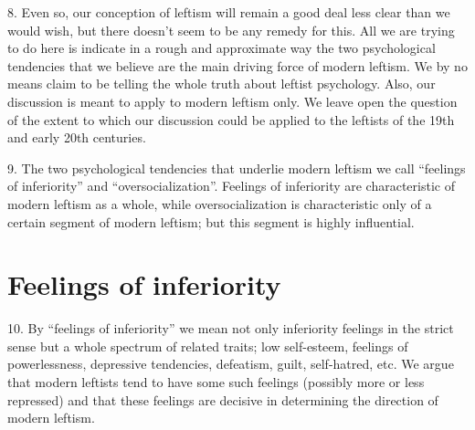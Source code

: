 \documentclass{article}
\begin{document}
8.  Even so, our conception of leftism will remain a good deal less clear than we would wish, but 
there doesn’t seem to be any remedy for this.  All we are trying to do here is indicate in a rough 
and approximate way the two psychological tendencies that we believe are the main driving force 
of modern leftism.  We by no means claim to be telling the whole truth about leftist 
psychology.  Also, our discussion is meant to apply to modern leftism only.  We leave open the 
question of the extent to which our discussion could be applied to the leftists of the 19th and early 
20th centuries. \vspace{\baselineskip}

9.  The two psychological tendencies that underlie modern leftism we call “feelings of inferiority” 
and  “oversocialization”.  Feelings  of  inferiority  are  characteristic  of  modern  leftism  as  a  whole,  
while  oversocialization  is  characteristic  only  of  a  certain  segment  of  modern  leftism;  but  this  
segment is highly influential.

\section{Feelings of inferiority}


\hspace{0.5cm} 10. By “feelings of inferiority” we mean not only inferiority feelings in the strict sense but a whole 
spectrum  of  related  traits;  low  self-esteem,  feelings  of  powerlessness,  depressive  tendencies,  
defeatism, guilt, self-hatred, etc.  We argue that modern leftists tend to have some such feelings 
(possibly more or less repressed) and that these feelings are decisive in determining the direction 
of modern leftism. \vspace{\baselineskip}
\end{document}
